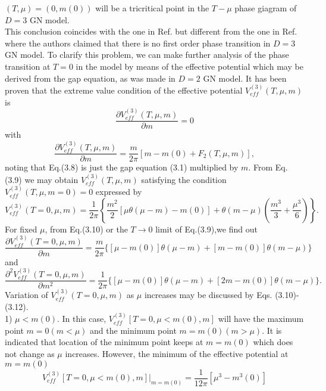 \documentclass[a4paper,eqsecnum]{revtex4}
\begin{document}
$(T,\mu)=(0,m(0))$ will be a tricritical point in the $T-\mu$ phase giagram of $D=3$ 
GN model. \\
\indent This conclusion coincides with the one in Ref. \cite{kn:13} but 
different from the one in Ref. \cite{kn:12} where the authors claimed that there is 
no first order phase transition in $D=3$ GN model. To clarify this problem, we can 
make further analysis of the phase transition at $T=0$ in the model by means of the 
effective potential which may be derived from the gap equation, as was made in $D=2$ 
GN model.  It has been proven that the extreme value condition of the effective 
potential $ V_{eff}^{(3)}(T,\mu,m)$ is \cite{kn:14}
\begin{equation}
\frac{\partial V_{eff}^{(3)}(T,\mu,m)}{\partial m}=0
\end{equation}%
with
\begin{equation}
\frac{\partial V_{eff}^{(3)}(T,\mu,m)}{\partial m}=
\frac{m}{2\pi}\left[m-m(0)+F_2(T,\mu,m)\right],
\end{equation}%
noting that Eq.(3.8) is just the gap equation (3.1) multiplied by $m$.  From Eq. (3.9) 
we may obtain $V_{eff}^{(3)}(T,\mu,m)$ satisfying the condition 
$V_{eff}^{(3)}(T,\mu,m=0)=0$ expressed by
\begin{equation}
V_{eff}^{(3)}(T=0,\mu,m)=\frac{1}{2\pi}\left\{\frac{m^2}{2}[\mu\theta(\mu-m)-m(0)]+\theta(m-\mu)\left(\frac{m^3}{3}+\frac{\mu^3}{6}\right)\right\}.
\end{equation}%
For fixed $\mu$, from Eq.(3.10) or the $T\to 0$ limit of Eq.(3.9),we find out
\begin{equation}
\frac{\partial V_{eff}^{(3)}(T=0,\mu,m)}{\partial m}=\frac{m}{2\pi}\{
[\mu-m(0)]\theta(\mu-m)+[m-m(0)]\theta(m-\mu)\}
\end{equation}%
and
\begin{equation}
\frac{\partial^2 V_{eff}^{(3)}(T=0,\mu,m)}{\partial m^2}=\frac{1}{2\pi}\{
[\mu-m(0)]\theta(\mu-m)+[2m-m(0)]\theta(m-\mu)\}.
\end{equation}%
Variation of $V_{eff}^{(3)}(T=0,\mu,m)$ as $\mu$ increases may be discussed by Eqs. (3.10)-(3.12). \\
1) $\mu<m(0)$. In this case, $V_{eff}^{(3)}[T=0,\mu<m(0),m]$ will 
have the maximum point $m=0 (m<\mu)$ and the minimum point $m=m(0) (m>\mu)$. It is 
indicated that location of the minimum point keeps at $m=m(0)$ which does not change 
as $\mu$ increases. However, the minimum of the effective potential at $m=m(0)$ 
\begin{equation}
V_{eff}^{(3)}[T=0,\mu<m(0),m]|_{m=m(0)}=\frac{1}{12\pi}[\mu^3-m^3(0)]
\end{equation}%
\end{document}
